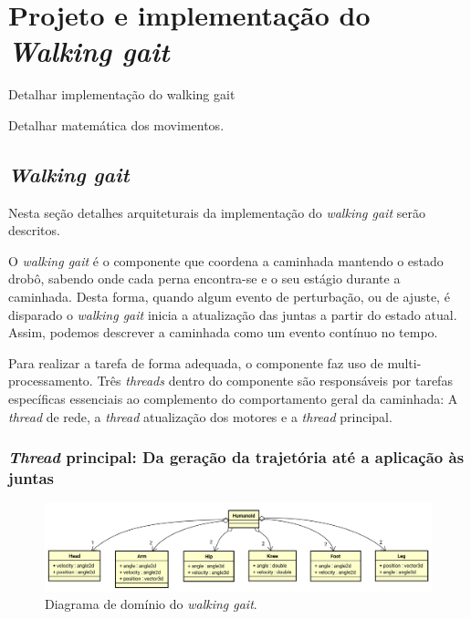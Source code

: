 \chapter{Projeto e implementação do \textit{Walking gait}}
\label{ch:Math}

\begin{guide}
	Detalhar implementação do walking gait
\end{guide}

\begin{guide}
	Detalhar matemática dos movimentos.
\end{guide}

\section{\textit{Walking gait}}

Nesta seção detalhes arquiteturais da implementação do \textit{walking gait} serão descritos.

O \textit{walking gait} é o componente que coordena a caminhada mantendo o estado drobô, sabendo onde cada perna encontra-se e o seu estágio durante a caminhada. Desta forma, quando algum evento de perturbação, ou de ajuste, é disparado o \textit{walking gait} inicia a atualização das juntas a partir do estado atual. Assim, podemos descrever a caminhada como um evento contínuo no tempo.

Para realizar a tarefa de forma adequada, o componente faz uso de multi-processamento. Três \textit{threads} dentro do componente são responsáveis por tarefas específicas essenciais ao complemento do comportamento geral da caminhada: A \textit{thread} de rede, a \textit{thread} atualização dos motores e a \textit{thread} principal.

\subsection{\textit{Thread} principal: Da geração da trajetória até a aplicação às juntas}

\begin{figure}[h!]
	\centering
	\includegraphics[scale=0.4]{imagens/svg/walkinggait-domain}
	\caption{Diagrama de domínio do \textit{walking gait}.}
	\label{fig:walkinggait:domain}
\end{figure}


